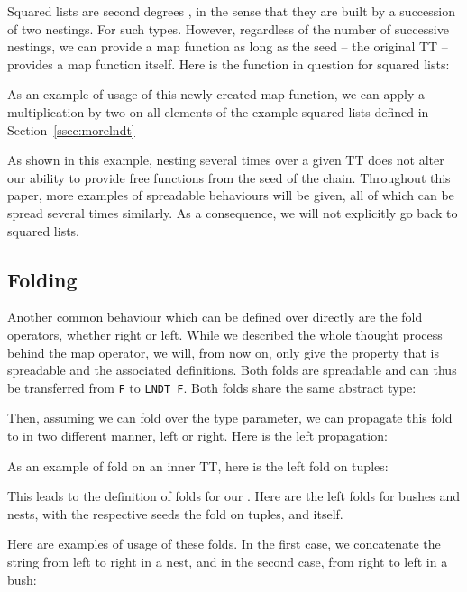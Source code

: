 \documentclass[a4paper,UKenglish,cleveref, autoref, thm-restate]{lipics}
\begin{document}
 Squared lists are second degrees \linears, in the sense that they are built by a succession of two nestings. For such types. However, regardless of the number of successive nestings, we can provide a map function as long as the seed -- the original TT -- provides a map function itself. Here is the function in question for squared lists:

\lndtlistmap

As an example of usage of this newly created map function, we can apply a multiplication by two on all elements of the example squared lists defined in Section~\ref{ssec:morelndt}

\lndtlistmapexample

As shown in this example, nesting several times over a given TT does not alter our ability to provide free functions from the seed of the chain. Throughout this paper, more examples of spreadable behaviours will be given, all of which can be spread several times similarly. As a consequence, we will not explicitly go back to squared lists.

\subsection{Folding \linears}\label{ssec:folds}

Another common behaviour which can be defined over \linears directly are the fold operators, whether right or left. While we described the whole thought process behind the map operator, we will, from now on, only give the property that is spreadable and the associated definitions. Both folds are spreadable and can thus be transferred from \texttt{F} to \texttt{LNDT F}. Both folds share the same abstract type:

\fold

Then, assuming we can fold over the type parameter, we can propagate this fold to \linear in two different manner, left or right. Here is the left propagation:

\folds

As an example of fold on an inner TT, here is the left fold on tuples:

\foldtuples

This leads to the definition of folds for our \linears. Here are the left folds for bushes and nests, with the respective seeds the fold on tuples, and itself.

\foldsinstances

Here are examples of usage of these folds. In the first case, we concatenate the string from left to right in a nest, and in the second case, from right to left in a bush:
\end{document}
